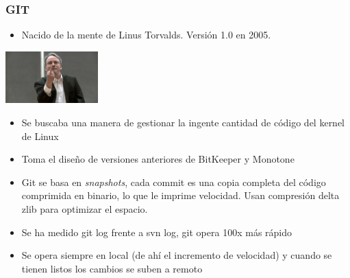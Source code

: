 \frame
{
\frametitle{GIT}
\begin{itemize}
 \item Nacido de la mente de Linus Torvalds. Versión 1.0 en 2005. 
\end{itemize}

\begin{center}
  \includegraphics[height=2cm]{imgs/linus.png}    
\end{center}

\begin{itemize}
 \item Se buscaba una manera de gestionar la ingente cantidad de código del kernel de Linux
 \item Toma el diseño de versiones anteriores de BitKeeper y Monotone
 \item Git se basa en \textit{snapshots}, cada commit es una copia completa del código comprimida en binario, lo que le imprime velocidad. Usan compresión delta zlib para optimizar el espacio.
 \item Se ha medido git log frente a svn log, git opera 100x más rápido
 \item Se opera siempre en local (de ahí el incremento de velocidad) y cuando se tienen listos los cambios se suben a remoto
\end{itemize}
}